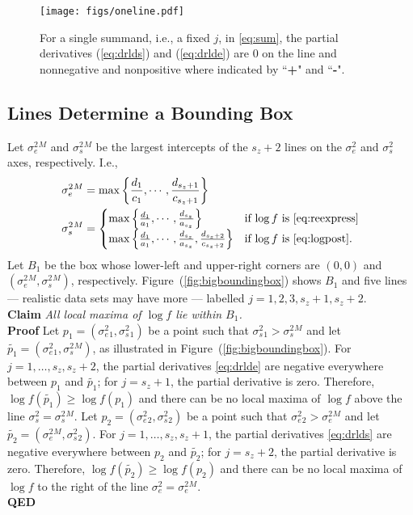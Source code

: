 \documentclass{report}
\newcommand{\RL}{f}
\newcommand{\logRL}{\log\RL}
\newcommand{\sigssq}{\sigma_s^2}
\newcommand{\sigesq}{\sigma_e^2}
\begin{document}
\begin{figure}[h]
	\centering
	\texttt{[image: figs/oneline.pdf]}
	\caption{For a single summand, i.e., a fixed $j$, in \eqref{eq:sum},
	              the partial derivatives (\ref{eq:drlds}) and (\ref{eq:drlde})
	              are 0 on the line and nonnegative and nonpositive
	              where indicated by ``\textbf{+}" and ``\textbf{-}".}
	\label{fig:oneline}
\end{figure}

\subsection{Lines Determine a Bounding Box}
\label{sec:boundingbox}

Let $\sigesq{}^M$ and $\sigssq{}^M$ be the largest intercepts of the $s_z+2$ lines on the $\sigesq$ and $\sigssq$ axes, respectively.  I.e.,
\begin{align*}
  \sigesq{}^M &= \max \left\{ \frac{d_1}{c_1}, \cdots, \frac{d_{s_z+1}}{c_{s_z+1}} \right\}\\
  \sigssq{}^M &= \begin{cases}
                             \max \left\{ \frac{d_1}{a_1}, \cdots, \frac{d_{s_z}}{a_{s_z}} \right\} &
                                  \text{if $\logRL$ is \eqref{eq:reexpress}}\\
                             \max \left\{ \frac{d_1}{a_1}, \cdots, \frac{d_{s_z}}{a_{s_z}}, \frac{d_{s_z+2}}{c_{s_z+2}} \right\} &
                                  \text{if $\logRL$ is \eqref{eq:logpost}}.
                           \end{cases}
\end{align*}
Let $B_1$ be the box whose lower-left and upper-right corners are $(0,0)$ and $(\sigesq{}^M,\sigssq{}^M)$, respectively.  Figure~(\ref{fig:bigboundingbox}) shows $B_1$ and five lines --- realistic data sets may have more --- labelled $j=1, 2, 3, s_z+1, s_z+2$.\\[5pt]
\textbf{Claim} \emph{All local maxima of $\logRL$ lie within $B_1$.}\\[5pt]
\textbf{Proof} Let $p_1 = (\sigesq{}_1, \sigssq{}_1)$ be a point such that $\sigssq{}_1 > \sigssq{}^M$ and let $\widetilde{p_1} = (\sigesq{}_1, \sigssq{}^M)$, as illustrated in Figure~(\ref{fig:bigboundingbox}).  For $j=1, \dots, s_z, s_z+2$, the partial derivatives \eqref{eq:drlde} are negative everywhere between $p_1$ and $\widetilde{p_1}$; for $j=s_z+1$, the partial derivative is zero.  Therefore, $\logRL(\widetilde{p_1}) \ge \logRL(p_1)$ and there can be no local maxima of $\logRL$ above the line $\sigssq = \sigssq{}^M$.  Let $p_2 = (\sigesq{}_2, \sigssq{}_2)$ be a point such that $\sigesq{}_2 > \sigesq{}^M$ and let $\widetilde{p_2} = (\sigesq{}^M, \sigssq{}_2)$.  For $j=1, \dots, s_z, s_z+1$, the partial derivatives \eqref{eq:drlds} are negative everywhere between $p_2$ and $\widetilde{p_2}$; for $j=s_z+2$, the partial derivative is zero.   Therefore, $\logRL(\widetilde{p_2}) \ge \logRL(p_2)$ and there can be no local maxima of $\logRL$ to the right of the line $\sigesq = \sigesq{}^M$.\\
\textbf{QED}\\
\end{document}
